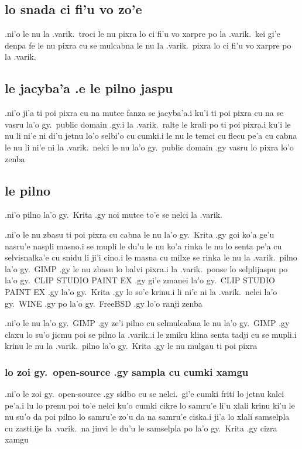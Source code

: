 \documentclass{report}
\begin{document}
\subsection{lo snada ci fi'u vo zo'e}
.ni'o le nu la .varik.\ troci le nu pixra lo ci fi'u vo xarpre po la .varik.\ kei gi'e denpa fe le nu pixra cu se mulcabna le nu la .varik.\ pixra lo ci fi'u vo xarpre po la .varik.
\subsection{le jacyba'a .e le pilno jaspu}
.ni'o ji'a ti poi pixra cu na mutce fanza se jacyba'a\@  .i ku'i ti poi pixra cu na se vasru la'o gy.\ public domain .gy\@  .i la .varik.\ ralte le krali po ti poi pixra\@  .i ku'i le nu li ni'e ni di'u jetnu lo'o selbi'o cu cumki\@  .i le nu le temci cu flecu pe'a cu cabna le nu li ni'e ni la .varik.\ nelci le nu la'o gy.\ public domain .gy vasru lo pixra lo'o zenba

\subsection{le pilno}
.ni'o pilno la'o gy.\ Krita .gy noi mutce to'e se nelci la .varik.

.ni'o le nu zbasu ti poi pixra cu cabna le nu la'o gy.\ Krita .gy goi ko'a ge'u nasru'e naspli masno\@  .i se mupli le du'u le nu ko'a rinka le nu lo senta pe'a cu selvisnalka'e cu snidu li ji'i cino\@  .i le masna cu milxe se rinka le nu la .varik.\ pilno la'o gy.\ GIMP .gy le nu zbasu lo balvi pixra\@  .i la .varik.\ ponse lo selplijaspu po la'o gy.\ CLIP STUDIO PAINT EX .gy gi'e zmanei la'o gy.\ CLIP STUDIO PAINT EX .gy la'o gy.\ Krita .gy lo so'e krinu\@  .i li ni'e ni la .varik.\ nelci la'o gy.\ WINE .gy po la'o gy.\ FreeBSD .gy lo'o ranji zenba

.ni'o le nu la'o gy.\ GIMP .gy ze'i pilno cu selmulcabna le nu la'o gy.\ GIMP .gy claxu lo su'o jicmu poi se pilno la .varik.\@  .i le zmiku klina senta tadji cu se mupli\@  .i krinu le nu la .varik.\ pilno la'o gy.\ Krita .gy le nu mulgau ti poi pixra

\subsubsection{lo zoi gy.\ open-source .gy sampla cu cumki xamgu}
.ni'o le zoi gy.\ open-source .gy sidbo cu se nelci.\ gi'e cumki friti lo jetnu kalci pe'a\@\@  .i lu lo prenu poi to'e nelci ku'o cumki cikre lo samru'e li'u xlali krinu ki'u le nu su'o da poi pilno lo samru'e zo'u da na samru'e ciska\@\@  .i ji'a lo xlali samselpla cu zasti\@  .ije la .varik.\ na jinvi le du'u le samselpla po la'o gy.\ Krita .gy cizra xamgu
\end{document}
